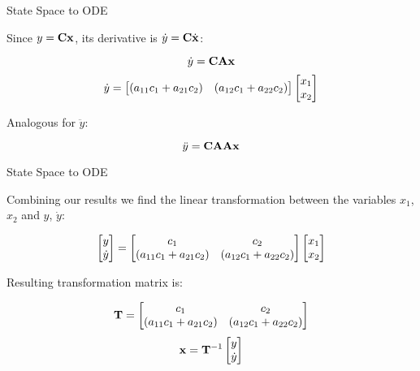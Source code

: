 \documentclass{beamer}
\begin{document}
\begin{frame}{State Space to ODE}
	\begin{flushleft}
		
		Since $y = \mathbf{C} \mathbf{x}$, its derivative is $\dot y = \mathbf{C} \dot{\mathbf{x}}$:
		
		\begin{equation}
			\dot y = \mathbf{C} \mathbf{A} \mathbf{x}
		\end{equation}
		\begin{equation}
			\dot y = \begin{bmatrix} (a_{11}c_1 + a_{21}c_2) & (a_{12}c_1 + a_{22}c_2) \end{bmatrix}
			\begin{bmatrix} x_1 \\ x_2 \end{bmatrix}    
		\end{equation}
		
		Analogous for $\ddot y$:
		
		\begin{equation}
			\ddot y = \mathbf{C} \mathbf{A} \mathbf{A} \mathbf{x}
		\end{equation}
		
	\end{flushleft}
\end{frame}




\begin{frame}{State Space to ODE}
	\begin{flushleft}
		
		Combining our results we find the linear transformation between the variables $x_1$, $x_2$ and $y$, $\dot y$:
		
		\begin{equation}
			\begin{bmatrix} y \\ \dot y \end{bmatrix} = 
			\begin{bmatrix}
				c_1                                     & c_2 \\ 
				(a_{11}c_1 + a_{21}c_2) & (a_{12}c_1 + a_{22}c_2)
			\end{bmatrix} 
			\begin{bmatrix} x_1 \\ x_2 \end{bmatrix}    
		\end{equation}
		
		Resulting transformation matrix is:
		
		\begin{equation}
			\mathbf{T} = 
			\begin{bmatrix}
				c_1                                     & c_2 \\ 
				(a_{11}c_1 + a_{21}c_2) & (a_{12}c_1 + a_{22}c_2)
			\end{bmatrix} 
		\end{equation}
		\begin{equation}
			\mathbf{x}
			= 
			\mathbf{T}^{-1}
			\begin{bmatrix}
				y \\ 
				\dot y
			\end{bmatrix} 
		\end{equation}
		
	\end{flushleft}
\end{frame}
\end{document}

